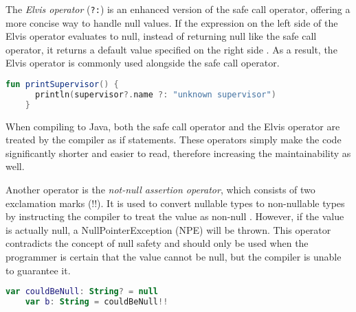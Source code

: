 \documentclass[a4paper, 11pt]{article}
\begin{document}
  The \textit{Elvis operator} (\texttt{?:}) is an enhanced version of the safe call operator, offering a more concise way to handle null values. If the expression on the left side of the Elvis operator evaluates to null, instead of returning null like the safe call operator, it returns a default value specified on the right side \cite{nullsafety-elvis}. As a result, the Elvis operator is commonly used alongside the safe call operator.
  \begin{lstlisting}[language=Kotlin]
    fun printSupervisor() {
      println(supervisor?.name ?: "unknown supervisor")
    }
  \end{lstlisting}
  When compiling to Java, both the safe call operator and the Elvis operator are treated by the compiler as if statements. These operators simply make the code significantly shorter and easier to read, therefore increasing the maintainability as well.
 
  Another operator is the \textit{not-null assertion operator}, which consists of two exclamation marks (!!). It is used to convert nullable types to non-nullable types by instructing the compiler to treat the value as non-null \cite{nullsafety-assertion}. However, if the value is actually null, a NullPointerException (NPE) will be thrown. This operator contradicts the concept of null safety and should only be used when the programmer is certain that the value cannot be null, but the compiler is unable to guarantee it.
  \begin{lstlisting}[language=Kotlin,title={Usage of the not-null assertion}]
    var couldBeNull: String? = null
    var b: String = couldBeNull!!
  \end{lstlisting}
\end{document}

